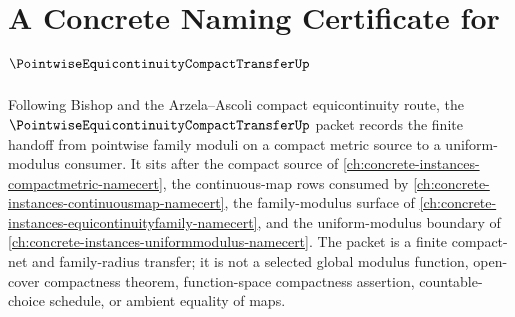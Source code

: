 \chapter{A Concrete Naming Certificate for $\PointwiseEquicontinuityCompactTransferUp$}
\label{ch:concrete-instances-pointwise-equicontinuity-compact-transfer-namecert}

Following Bishop and the Arzela--Ascoli compact equicontinuity route, the $\PointwiseEquicontinuityCompactTransferUp$ packet records the finite handoff from pointwise family moduli on a compact metric source to a uniform-modulus consumer. It sits after the compact source of \autoref{ch:concrete-instances-compactmetric-namecert}, the continuous-map rows consumed by \autoref{ch:concrete-instances-continuousmap-namecert}, the family-modulus surface of \autoref{ch:concrete-instances-equicontinuityfamily-namecert}, and the uniform-modulus boundary of \autoref{ch:concrete-instances-uniformmodulus-namecert}. The packet is a finite compact-net and family-radius transfer; it is not a selected global modulus function, open-cover compactness theorem, function-space compactness assertion, countable-choice schedule, or ambient equality of maps.

